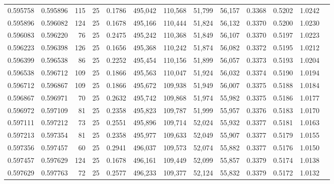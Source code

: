 \begin{tabular}{rrrrrrrrrrrrr}
0.595758 & 0.595896 &   115 &  25 &                                     0.1786 & 495,042 & 110,568 &  51,799 &  56,157 & 0.3368 & 0.5202 & 1.0242 \\
0.595896 & 0.596082 &   124 &  25 &                                     0.1678 & 495,166 & 110,444 &  51,824 &  56,132 & 0.3370 & 0.5200 & 1.0230 \\
0.596083 & 0.596220 &    76 &  25 &                                     0.2475 & 495,242 & 110,368 &  51,849 &  56,107 & 0.3370 & 0.5197 & 1.0223 \\
0.596223 & 0.596398 &   126 &  25 &                                     0.1656 & 495,368 & 110,242 &  51,874 &  56,082 & 0.3372 & 0.5195 & 1.0212 \\
0.596399 & 0.596538 &    86 &  25 &                                     0.2252 & 495,454 & 110,156 &  51,899 &  56,057 & 0.3373 & 0.5193 & 1.0204 \\
0.596538 & 0.596712 &   109 &  25 &                                     0.1866 & 495,563 & 110,047 &  51,924 &  56,032 & 0.3374 & 0.5190 & 1.0194 \\
0.596712 & 0.596867 &   109 &  25 &                                     0.1866 & 495,672 & 109,938 &  51,949 &  56,007 & 0.3375 & 0.5188 & 1.0184 \\
0.596867 & 0.596971 &    70 &  25 &                                     0.2632 & 495,742 & 109,868 &  51,974 &  55,982 & 0.3375 & 0.5186 & 1.0177 \\
0.596972 & 0.597109 &    81 &  25 &                                     0.2358 & 495,823 & 109,787 &  51,999 &  55,957 & 0.3376 & 0.5183 & 1.0170 \\
0.597111 & 0.597212 &    73 &  25 &                                     0.2551 & 495,896 & 109,714 &  52,024 &  55,932 & 0.3377 & 0.5181 & 1.0163 \\
0.597213 & 0.597354 &    81 &  25 &                                     0.2358 & 495,977 & 109,633 &  52,049 &  55,907 & 0.3377 & 0.5179 & 1.0155 \\
0.597356 & 0.597457 &    60 &  25 &                                     0.2941 & 496,037 & 109,573 &  52,074 &  55,882 & 0.3377 & 0.5176 & 1.0150 \\
0.597457 & 0.597629 &   124 &  25 &                                     0.1678 & 496,161 & 109,449 &  52,099 &  55,857 & 0.3379 & 0.5174 & 1.0138 \\
0.597629 & 0.597763 &    72 &  25 &                                     0.2577 & 496,233 & 109,377 &  52,124 &  55,832 & 0.3379 & 0.5172 & 1.0132 \\

\end{tabular}
